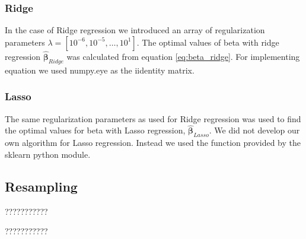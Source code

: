 

\subsubsection{Ridge}
In the case of Ridge regression we introduced an array of regularization
parameters $\lambda = [10^{-6}, 10^{-5}, \hdots, 10^{1}]$. The optimal values
of beta with ridge regression $\hat{\bm{\beta } } _{Ridge} $ was calculated
from equation \eqref{eq:beta_ridge}. For implementing equation we used numpy.eye as the iidentity matrix. 

\subsubsection{Lasso}
The same regularization parameters as used for Ridge regression was used to find the
optimal values for beta with Lasso regression, $\hat{\bm{\beta } } _{Lasso} $. We did not develop our
own algorithm for Lasso regression. Instead we used the function provided by the
sklearn python module.  

\subsection{Resampling}
???????????

???????????

